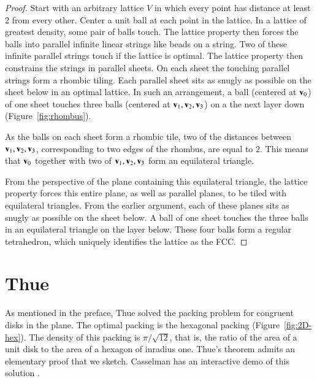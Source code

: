 \begin{proof}
Start with an arbitrary lattice $V$ in which every point has distance 
at least $2$ from every other.  Center a unit ball at each point in
the lattice.  In a lattice of greatest density, some pair of balls
touch.  The lattice property then forces the balls into parallel
infinite linear strings like beads on a string.  Two of these infinite
parallel strings touch if the lattice is  optimal.  The
lattice property then constrains the strings in parallel sheets.  On
each sheet the touching parallel strings form a rhombic tiling.  Each
parallel sheet sits as snugly as possible on the sheet below in an optimal
lattice.  In such an arrangement, a ball (centered at
${\mathbf v}_0$) of one sheet touches three balls (centered at
${\mathbf v}_1,{\mathbf v}_2,{\mathbf v}_3$) on a the next layer down (Figure~\ref{fig:rhombus}).

\figAFRJFRK %


As the balls on each sheet form a rhombic tile, two of the distances
between ${\mathbf v}_1,{\mathbf v}_2,{\mathbf v}_3$, corresponding to two edges of the rhombus, are
equal to $2$.  This means that ${\mathbf v}_0$ together with two of
${\mathbf v}_1,{\mathbf v}_2,{\mathbf v}_3$ form an equilateral triangle.  

From the perspective of the plane containing this equilateral
triangle, the lattice property forces this entire plane, as well as
parallel planes, to be tiled with equilateral triangles.  From the
earlier argument, each of these planes sits as snugly as possible on
the sheet below.  A ball of one sheet touches the three balls in an
equilateral triangle on the layer below.  These four balls form a
regular tetrahedron, which uniquely identifies the lattice as the FCC.
\end{proof}






\section{Thue}\label{sec:thue}


As mentioned in the preface, Thue solved the packing problem for
congruent disks in the plane.  The optimal packing is the hexagonal
packing (Figure~\ref{fig:2D-hex}).  The density of this packing is
$\pi/\sqrt{12}$, that is, the ratio of the area of a unit disk to the
area of a hexagon of inradius one.  Thue's theorem admits an
elementary proof that we sketch.  Casselman has an 
interactive demo of this solution \cite{casselman:pennies}.

